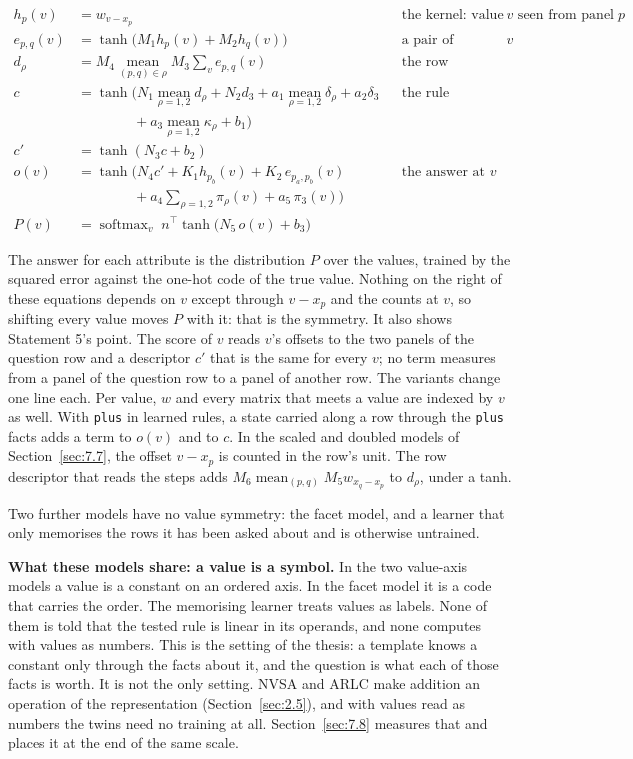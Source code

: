 \begin{align*}
h_p(v) &= w_{v - x_p} && \text{the kernel: value } v \text{ seen from panel } p\\
e_{p,q}(v) &= \tanh\big( M_1 h_p(v) + M_2 h_q(v) \big) && \text{a pair of neighbours, at } v\\
d_\rho &= M_4 \operatorname*{mean}_{(p,q) \in \rho} M_3 \sum_{v} e_{p,q}(v) && \text{the row descriptor}\\
c &= \tanh\Big( N_1 \operatorname*{mean}_{\rho = 1,2} d_\rho + N_2 d_3 + a_1 \operatorname*{mean}_{\rho = 1,2} \delta_\rho + a_2 \delta_3 && \text{the rule descriptor}\\
&\qquad\qquad + a_3 \operatorname*{mean}_{\rho = 1,2} \kappa_\rho + b_1 \Big)\\
c' &= \tanh(N_3 c + b_2)\\
o(v) &= \tanh\Big( N_4 c' + K_1 h_{p_b}(v) + K_2\, e_{p_a,p_b}(v) && \text{the answer at } v\\
&\qquad\qquad + a_4 \sum_{\rho = 1,2} \pi_\rho(v) + a_5\, \pi_3(v) \Big)\\
P(v) &= \operatorname{softmax}_v \; n^{\top} \tanh\big( N_5\, o(v) + b_3 \big)
\end{align*}

The answer for each attribute is the distribution \(P\) over the values, trained by the squared error against the one-hot code of the true value. Nothing on the right of these equations depends on \(v\) except through \(v - x_p\) and the counts at \(v\), so shifting every value moves \(P\) with it: that is the symmetry. It also shows Statement 5's point. The score of \(v\) reads \(v\)'s offsets to the two panels of the question row and a descriptor \(c'\) that is the same for every \(v\); no term measures from a panel of the question row to a panel of another row. The variants change one line each. Per value, \(w\) and every matrix that meets a value are indexed by \(v\) as well. With \texttt{plus} in learned rules, a state carried along a row through the \texttt{plus} facts adds a term to \(o(v)\) and to \(c\). In the scaled and doubled models of Section~\ref{sec:7.7}, the offset \(v - x_p\) is counted in the row's unit. The row descriptor that reads the steps adds \(M_6 \operatorname{mean}_{(p,q)} M_5 w_{x_q - x_p}\) to \(d_\rho\), under a tanh.

Two further models have no value symmetry: the facet model, and a learner that only memorises the rows it has been asked about and is otherwise untrained.

\textbf{What these models share: a value is a symbol.} In the two value-axis models a value is a constant on an ordered axis. In the facet model it is a code that carries the order. The memorising learner treats values as labels. None of them is told that the tested rule is linear in its operands, and none computes with values as numbers. This is the setting of the thesis: a template knows a constant only through the facts about it, and the question is what each of those facts is worth. It is not the only setting. NVSA and ARLC make addition an operation of the representation (Section~\ref{sec:2.5}), and with values read as numbers the twins need no training at all. Section~\ref{sec:7.8} measures that and places it at the end of the same scale.

